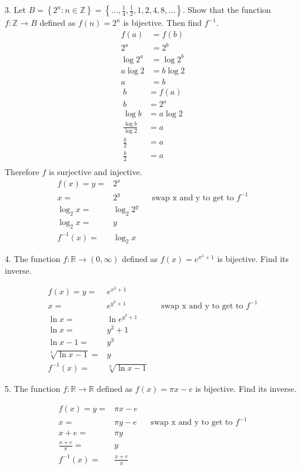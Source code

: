 \documentclass{idrisMemo}
\begin{document}
\begin{prooflist}{3. Let $B=\left\{2^n: n \in \mathbb{Z}\right\}=\left\{\ldots,
    \frac{1}{4}, \frac{1}{2}, 1,2,4,8, \ldots\right\}$. Show that the function
$f: \mathbb{Z} \rightarrow B$ defined as $f(n)=2^n$ is bijective. Then find
$f^{-1}$.}
\inj{}
\begin{align*}
    f(a)&=f(b)\\
    2^a&=2^b\\
    \log 2^a&=\log 2^b\\
    a \log 2&=b \log 2\\
    a&=b
\end{align*}
\surj{}
\begin{align*}
    b&=f(a)\\
    b&=2^a\\
    \log b&=a \log 2\\
    \frac{\log b}{\log 2} &= a\\
    \frac{b}{2} &= a\\
    \frac{b}{2} &= a\\
\end{align*}
Therefore $f$ is surjective and injective.
\begin{align*}
    f(x)=y=&2^x\\
    x=&2^y&&\text{swap x and y to get to }f^{-1}\\
    \log_2 x=&\log_2 2^y\\
    \log_2 x=&y\\
    f^{-1}(x) =& \log_2 x
\end{align*}
\end{prooflist}

\begin{prooflist}{4. The function $f: \mathbb{R} \rightarrow(0, \infty)$ defined
    as $f(x)=e^{x^3+1}$ is bijective. Find its inverse.}
    \item
\begin{align*}
    f(x)=y=&e^{x^3+1}\\
    x=&e^{y^3+1}&&\text{swap x and y to get to }f^{-1}\\
    \ln x=&\ln e^{y^3+1}\\
    \ln x=&y^3+1\\
    \ln x-1=&y^3\\
    \sqrt[3]{\ln x-1}=&y\\
    f^{-1}(x) =& \sqrt[3]{\ln x-1}
\end{align*}
\end{prooflist}

\begin{prooflist}{5. The function $f: \mathbb{R} \rightarrow \mathbb{R}$ defined
    as $f(x)=\pi x-e$ is bijective. Find its inverse.}
\item
\begin{align*}
    f(x)=y=&\pi x-e\\
    x=&\pi y-e&&\text{swap x and y to get to }f^{-1}\\
    x+e=&\pi y\\
    \frac{x+e}{\pi}=&y\\
    f^{-1}(x) =& \frac{x+e}{\pi}
\end{align*}
\end{prooflist}
\end{document}
